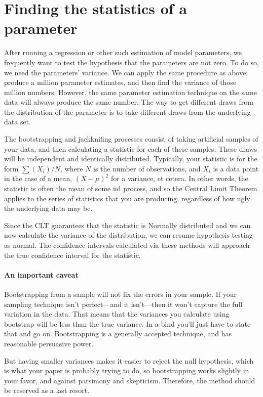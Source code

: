 \section{Finding the statistics of a parameter}
After running a regression or other such estimation of model parameters,
we frequently want to test the hypothesis that the parameters are not
zero. To do so, we need the parameters' variance.
We can apply the same procedure as above: produce a million parameter
estimates, and then find the variance of those million numbers. However,
the same parameter estimation technique on the same data will always
produce the same number. The way to get different draws from the
distribution of the parameter is to take different draws from the
underlying data set.

The bootstrapping and jackknifing processes consist of taking artificial
samples of your data, and then calculating a statistic for each of these
samples. These draws will be independent and identically distributed.
Typically, your statistic is for the form $\sum (X_i)/ N$, where  $N$
is the number of observations, and $X_i$ is a data point in the case
of a mean, $(X-\mu)^2$ for a variance, et cetera. In other words, the
statistic is often the mean of some iid process, and so the Central
Limit Theorem applies to the series of statistics that you are
producing, regardless of how ugly the underlying data may be.

Since the CLT guarantees that the  statistic is Normally distributed
and we can now calculate the variance of the distribution, we can resume
hypothesis testing as normal. The confidence intervals calculated via these
methods will approach the true confidence interval for the statistic.

\paragraph{An important caveat} Bootstrapping from a sample will not fix
the errors in your sample. If your sampling technique isn't perfect---and
it isn't---then it won't capture the full variation in the data. That
means that the variances you calculate using bootstrap will be less than
the true variance. In a bind you'll just have
to state that and go on. Bootstrapping is a generally accepted technique,
and has reasonable persuasive power.

But having smaller variances makes
it easier to reject the null hypothesis, which is what your paper is
probably trying to do, so bootstrapping works slightly in your favor,
and against parsimony and skepticism. Therefore, the method should be
reserved as a last resort.


